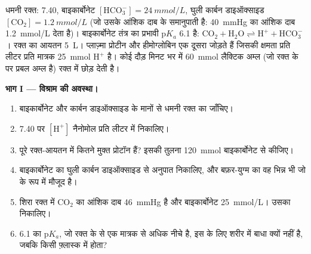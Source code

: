 \begin{problem}
\label{pb:b1:water-small-molecules:1}
धमनी रक्त:  7.40, बाइकार्बोनेट $[\mathrm{HCO_3^-}] =
\qty{24}{mmol/L}$, घुली कार्बन डाइऑक्साइड $[\mathrm{CO_2}] =
\qty{1.2}{mmol/L}$ (जो उसके आंशिक दाब के समानुपाती है: \qty{40}{mmHg}
का आंशिक दाब \qty{1.2}{mmol/L} देता है)। बाइकार्बोनेट तंत्र का प्रभावी
p$K_a$ 6.1 है: $\mathrm{CO_2} + \mathrm{H_2O}
\rightleftharpoons \mathrm{H^+} + \mathrm{HCO_3^-}$। रक्त का आयतन
\qty{5}{L}। प्लाज़्मा प्रोटीन और हीमोग्लोबिन एक दूसरा  जोड़ते हैं
जिसकी क्षमता प्रति लीटर प्रति  मात्रक \qty{25}{mmol} $\mathrm{H^+}$
है। कोई दौड़ मिनट भर में \qty{60}{mmol} लैक्टिक अम्ल (जो रक्त के  पर
प्रबल अम्ल है) रक्त में छोड़ देती है।

\medskip
\noindent\textbf{भाग I --- विश्राम की अवस्था।}
\begin{enumerate}
  \item बाइकार्बोनेट और कार्बन डाइऑक्साइड के मानों से धमनी रक्त का 
        जाँचिए।
  \item {} 7.40 पर $[\mathrm{H^+}]$ नैनोमोल प्रति लीटर में निकालिए।
  \item पूरे रक्त-आयतन में कितने मुक्त प्रोटॉन हैं? इसकी तुलना
        \qty{120}{mmol} बाइकार्बोनेट से कीजिए।
  \item बाइकार्बोनेट का घुली कार्बन डाइऑक्साइड से अनुपात निकालिए, और
        बफ़र-युग्म का वह भिन्न भी जो  के रूप में मौजूद है।
  \item शिरा रक्त में $\mathrm{CO_2}$ का आंशिक दाब \qty{46}{mmHg} है
        और बाइकार्बोनेट \qty{25}{mmol/L}। उसका  निकालिए।
  \item 6.1 का p$K_a$, जो रक्त के  से एक मात्रक से अधिक नीचे है, इस
         के लिए शरीर में बाधा क्यों नहीं है, जबकि किसी फ़्लास्क में
        होता?
\end{enumerate}


\end{problem}
